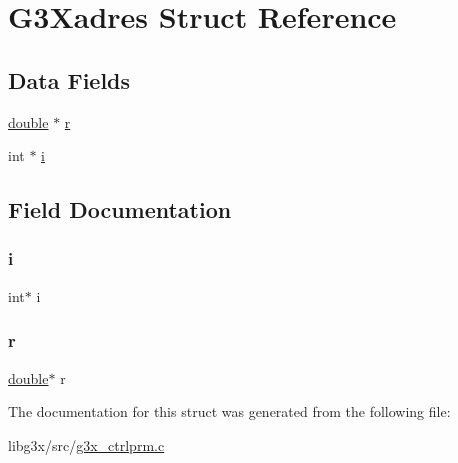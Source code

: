 \hypertarget{struct_g3_xadres}{}\section{G3\+Xadres Struct Reference}
\label{struct_g3_xadres}
\subsection*{Data Fields}
\begin{DoxyCompactItemize}
\item 
\hyperlink{g3x__transfo_8h_a89b2b23e407882a535d835574a7912e1}{double} $\ast$ \hyperlink{struct_g3_xadres_a318ae30f1efdf8759037f1c91f96a3a6}{r}
\item 
int $\ast$ \hyperlink{struct_g3_xadres_a9384343c8d6a756c1d78cdc73d351b8e}{i}
\end{DoxyCompactItemize}


\subsection{Field Documentation}
\mbox{\label{struct_g3_xadres_a9384343c8d6a756c1d78cdc73d351b8e}} 
\subsubsection{\texorpdfstring{i}{i}}
{\footnotesize\ttfamily int$\ast$ i}

\mbox{\label{struct_g3_xadres_a318ae30f1efdf8759037f1c91f96a3a6}} 
\subsubsection{\texorpdfstring{r}{r}}
{\footnotesize\ttfamily \hyperlink{g3x__transfo_8h_a89b2b23e407882a535d835574a7912e1}{double}$\ast$ r}



The documentation for this struct was generated from the following file\+:\begin{DoxyCompactItemize}
\item 
libg3x/src/\hyperlink{g3x__ctrlprm_8c}{g3x\+\_\+ctrlprm.\+c}\end{DoxyCompactItemize}
